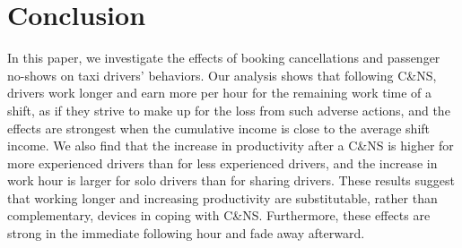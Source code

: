 \documentclass[reviewmode]{restat}
\begin{document}




\section{Conclusion}
\label{sec:conclude}
In this paper, we investigate the effects of booking cancellations and passenger no-shows on taxi 
drivers' behaviors. Our analysis shows that following C\&NS, drivers work longer and earn more per hour
for the remaining work time of a shift, as if they strive to make up for the loss from such adverse actions, and the effects are strongest when the cumulative income is close to the average shift income. 
We also find that the increase in productivity after a C\&NS is higher for more experienced drivers than for
 less experienced drivers, and the increase in work hour is larger for solo drivers than for sharing drivers.
These results suggest that working longer and increasing productivity are substitutable, rather than 
complementary, devices in coping with C\&NS. Furthermore, these effects are strong in the immediate 
following hour and fade away afterward.
\end{document}
